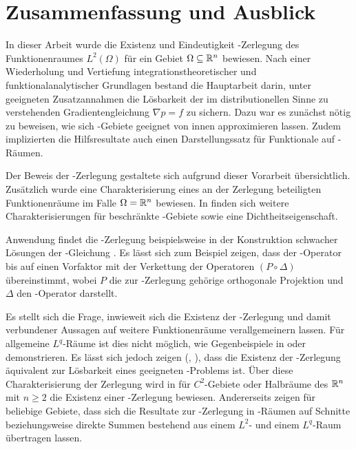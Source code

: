 \chapter{Zusammenfassung und Ausblick}

In dieser Arbeit wurde die Existenz und Eindeutigkeit \helmholtz\hyp{}Zerlegung des Funktionenraumes $L^2(\Omega)$ für ein Gebiet $\Omega \subseteq \mathbb{R}^n$ bewiesen.
Nach einer Wiederholung und Vertiefung integrationstheoretischer und funktionalanalytischer Grundlagen bestand die Hauptarbeit darin, unter geeigneten Zusatzannahmen die Lösbarkeit der im distributionellen Sinne zu verstehenden Gradientengleichung $\nabla p = f$ zu sichern.
Dazu war es zunächst nötig zu beweisen, wie sich \lipschitz\hyp{}Gebiete geeignet von innen approximieren lassen.
Zudem implizierten die Hilfsresultate auch einen Darstellungssatz für Funktionale auf \sobolev\hyp{}Räumen.

Der Beweis der \helmholtz\hyp{}Zerlegung gestaltete sich aufgrund dieser Vorarbeit übersichtlich.
Zusätzlich wurde eine Charakterisierung eines an der Zerlegung beteiligten Funktionenräume im Falle $\Omega = \mathbb{R}^n$ bewiesen.
In \cite[S.81ff., II.2.5]{sohr2001navier} finden sich weitere Charakterisierungen für beschränkte \lipschitz\hyp{}Gebiete sowie eine Dichtheitseigenschaft.

Anwendung findet die \helmholtz\hyp{}Zerlegung beispielsweise in der Konstruktion schwacher Lösungen der \stokes\hyp{}Gleichung \cite[S.129f.]{sohr2001navier}. 
Es lässt sich zum Beispiel zeigen, dass der \stokes\hyp{}Operator bis auf einen Vorfaktor mit der Verkettung der Operatoren $(P \circ \Delta)$ übereinstimmt, wobei $P$ die zur \helmholtz\hyp{}Zerlegung gehörige orthogonale Projektion und $\Delta$ den \laplace\hyp{}Operator darstellt.

Es stellt sich die Frage, inwieweit sich die Existenz der \helmholtz\hyp{}Zerlegung und damit verbundener Aussagen auf weitere Funktionenräume verallgemeinern lassen.
Für allgemeine $L^q$\hyp{}Räume ist dies nicht möglich, wie Gegenbeispiele in \cite{maslennikova1986elliptic} oder \cite{bogovski1986decomposition} demonstrieren.
Es lässt sich jedoch zeigen (\cite{simader1992new}, \cite[S.146, Lemma III.1.2]{galdi2011navier}), dass die Existenz der \helmholtz\hyp{}Zerlegung äquivalent zur Lösbarkeit eines geeigneten \neumann\hyp{}Problems ist. 
Über diese Charakterisierung der Zerlegung wird in \cite[S.152, Theorem III.1.2]{galdi2011navier} für $C^2$-Gebiete oder Halbräume des $\mathbb{R}^n$ mit $n \geq 2$ die Existenz einer \helmholtz\hyp{}Zerlegung bewiesen.
Andererseits zeigen \cite{farwig05thehelmholtz,farwig05anLq} für beliebige Gebiete, dass sich die Resultate zur \helmholtz\hyp{}Zerlegung in \hilbert\hyp{}Räumen auf Schnitte beziehungsweise direkte Summen bestehend aus einem $L^2$- und einem $L^q$\hyp{}Raum übertragen lassen.


